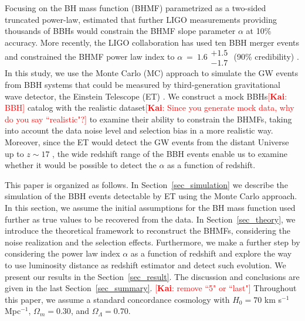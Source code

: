 \documentclass[twocolumn]{aastex62}
\newcommand{\kai}[1]{\textcolor{red}{[{\bf Kai}: #1]}}
\begin{document}
Focusing on the BH mass function (BHMF) parametrized as a two-sided truncated power-law, \citet{Kovetz2017PhRvD} estimated that further LIGO measurements providing thousands of BBHs would constrain the BHMF slope parameter $\alpha$ at 10\% accuracy. More recently, the LIGO collaboration has used ten BBH merger events and constrained the BHMF power law index to $\alpha~=~1.6\substack{+1.5\\-1.7}$ (90\% credibility) \citep{Abbott2018b}. 
In this study, we use the Monte Carlo (MC) approach to simulate the GW events from BBH systems that could be measured by third-generation gravitational wave detector, the Einstein Telescope (ET) \citep{Abernathy2011}. We construct a mock BBHs\kai{BBH} catalog with the realistic dataset\kai{Since you generate mock data, why do you say ``realistic"?} to examine their ability to constrain the BHMFs, taking into account the data noise level and selection bias in a more realistic way. Moreover, since the ET would detect the GW events from the distant Universe up to $z\sim17$ \citep{Abernathy2011}, the wide redshift range of the BBH events enable us to examine whether it would be possible to detect the $\alpha$ as a function of redshift.

This paper is organized as follows. In Section~\ref{sec_simulation} we describe the simulation of the BBH events detectable by ET using the Monte Carlo approach. In this section, we assume the initial assumptions for the BH mass function used further as true values to be recovered from the data. In Section~\ref{sec_theory}, we introduce the theoretical framework to reconstruct the BHMFs, considering the noise realization and the selection effects. Furthermore, we make a further step by considering the power law index $\alpha$ as a function of redshift and explore the way to use luminosity distance as redshift estimator and detect such evolution. We present our results in the Section~\ref{sec_result}. The discussion and conclusions are given in the last Section~\ref{sec_summary}. \kai{remove ``5" or ``last"}
Throughout this paper, we assume a standard concordance cosmology with $H_0= 70$ km s$^{-1}$ Mpc$^{-1}$, $\Omega{_m} = 0.30$, and $\Omega{_\Lambda} = 0.70$.



\vspace{1cm}
\end{document}
